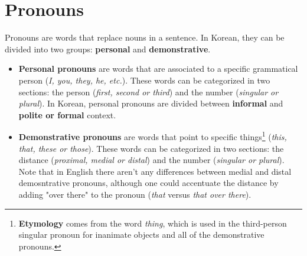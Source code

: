 \section{Pronouns}
Pronouns are words that replace nouns in a sentence. In Korean, they can be divided into two groups: \textbf{personal} and \textbf{demonstrative}.

\begin{itemize}
    \item \textbf{Personal pronouns} are words that are associated to a specific grammatical person (\textit{I, you, they, he, etc.}). These words can be categorized in two sections: the person (\textit{first, second or third}) and the number (\textit{singular or plural}). In Korean, personal pronouns are divided between \textbf{informal} and \textbf{polite or formal} context.
    
    \item \textbf{Demonstrative pronouns} are words that point to specific things\footnote{\textbf{Etymology}  comes from the word \textit{thing}, which is used in the third-person singular pronoun for inanimate objects and all of the demonstrative pronouns.} (\textit{this, that, these or those}). These words can be categorized in two sections: the distance (\textit{proximal, medial or distal}) and the number (\textit{singular or plural}). Note that in English there aren't any differences between medial and distal demosntrative pronouns, although one could accentuate the distance by adding "over there" to the pronoun (\textit{that} versus \textit{that over there}).
\end{itemize}


